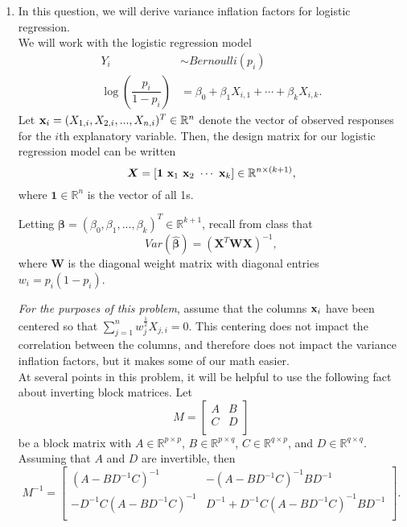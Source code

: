 \documentclass[11pt]{article}
\begin{document}
\begin{enumerate}
\begin{enumerate}
\end{enumerate}


\item In this question, we will derive variance inflation factors for logistic regression.\\

We will work with the logistic regression model
\begin{align*}
Y_i &\sim Bernoulli(p_i) \\
\log \left( \dfrac{p_i}{1 - p_i} \right) &= \beta_0 + \beta_1 X_{i,1} + \cdots + \beta_k X_{i,k}.
\end{align*}
Let ${\bf x}_i = (X_{1,i}, X_{2,i},...,X_{n,i})^T \in \mathbb{R}^n$ denote the vector of observed responses for the $i$th explanatory variable. Then, the design matrix for our logistic regression model can be written
$$\bm{X} = [\bm{1} \ {\bf x}_1 \ {\bf x}_2 \ \cdots \ {\bf x}_k] \in \mathbb{R}^{n \times (k + 1)},$$
where $\bm{1} \in \mathbb{R}^n$ is the vector of all 1s. 

Letting $\bm{\beta} = (\beta_0, \beta_1,...,\beta_k)^T \in \mathbb{R}^{k + 1}$, recall from class that
$$Var(\widehat{\bm{\beta}}) = (\bm{X}^T \bm{W} \bm{X})^{-1},$$
where $\bm{W}$ is the diagonal weight matrix with diagonal entries $w_i = p_i (1 - p_i)$.

\textit{For the purposes of this problem}, assume that the columns ${\bf x}_i$ have been centered so that $\sum \limits_{j=1}^n w_j^{\frac{1}{2}} X_{j,i} = 0$. This centering does not impact the correlation between the columns, and therefore does not impact the variance inflation factors, but it makes some of our math easier.\\

At several points in this problem, it will be helpful to use the following fact about inverting block matrices. Let 
$$M = \begin{bmatrix}
A & B \\
C & D\\
\end{bmatrix}$$
be a block matrix with $A \in \mathbb{R}^{p \times p}$, $B \in \mathbb{R}^{p \times q}$, $C \in \mathbb{R}^{q \times p}$, and $D \in \mathbb{R}^{q \times q}$. Assuming that $A$ and $D$ are invertible, then
$$M^{-1} = \begin{bmatrix}
(A - BD^{-1}C)^{-1} & -(A - BD^{-1}C)^{-1}BD^{-1} \\
-D^{-1}C(A - BD^{-1}C)^{-1} & D^{-1} + D^{-1}C(A - BD^{-1}C)^{-1}BD^{-1}\\
\end{bmatrix}.$$


\end{enumerate}
\end{document}

